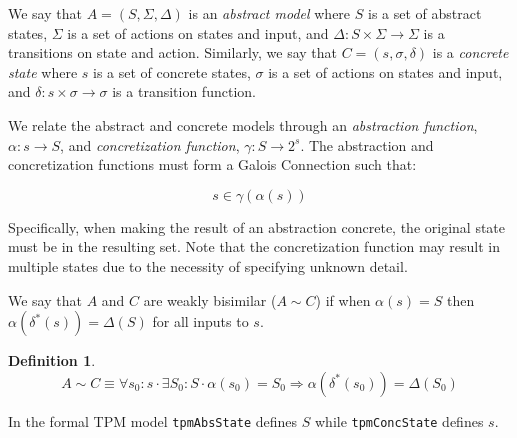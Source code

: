 \documentclass[10pt]{article}
\newtheorem{definition}{Definition}
\begin{document}
We say that $A=(S,\Sigma,\Delta)$ is an \emph{abstract model} where
$S$ is a set of abstract states, $\Sigma$ is a set of actions on
states and input, and $\Delta : S\times\Sigma\rightarrow\Sigma$ is a
transitions on state and action.  Similarly, we say that
$C=(s,\sigma,\delta)$ is a \emph{concrete state } where $s$ is a set
of concrete states, $\sigma$ is a set of actions on states and input,
and $\delta : s\times\sigma\rightarrow\sigma$ is a transition
function.

We relate the abstract and concrete models through an \emph{abstraction
function}, $\alpha:s\rightarrow S$, and \emph{concretization
function}, $\gamma:S\rightarrow 2^s$.  The abstraction and
concretization functions must form a Galois Connection such that:

\[s\in\gamma(\alpha(s))\]

\noindent Specifically, when making the result of an abstraction
concrete, the original state must be in the resulting set.  Note that
the concretization function may result in multiple states due to the
necessity of specifying unknown detail.

We say that $A$ and $C$ are weakly bisimilar ($A\sim C$) if when
$\alpha(s)=S$ then $\alpha(\delta^*(s))=\Delta(S)$ for all inputs to
$s$.

\begin{definition} 
  \[A\sim C \equiv \forall s_0:s \cdot \exists S_0:S \cdot
  \alpha(s_0)=S_0 \Rightarrow \alpha(\delta^*(s_0))=\Delta(S_0)\]
  \label{def:bisimulation}
\end{definition}

In the formal TPM model \texttt{tpmAbsState} defines $S$ while
\texttt{tpmConcState} defines $s$.

\appendix





\end{document}

